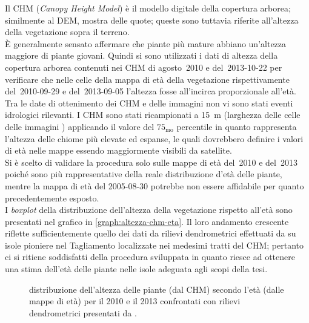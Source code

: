 Il CHM (\emph{Canopy Height Model}) è il modello digitale della copertura arborea; similmente al DEM, mostra delle quote; queste sono tuttavia riferite all'altezza della vegetazione sopra il terreno.
\\
È generalmente sensato affermare che piante più mature abbiano un'altezza maggiore di piante giovani.
Quindi si sono utilizzati i dati di altezza della copertura arborea contenuti nei CHM di agosto~2010 e del~2013-10-22 per verificare che nelle celle della mappa di età della vegetazione rispettivamente del~2010-09-29 e del~2013-09-05 l'altezza fosse all'incirca proporzionale all'età.
Tra le date di ottenimento dei CHM e delle immagini \AST{} non vi sono stati eventi idrologici rilevanti.
I CHM sono stati ricampionati a \SI{15}{\m} (larghezza delle celle delle immagini \AST{}) applicando il valore del $75_{\mathrm{mo}}$ percentile in quanto rappresenta l'altezza delle chiome più elevate ed espanse, le quali dovrebbero definire i valori di età nelle mappe essendo maggiormente visibili da satellite.
\\
Si è scelto di validare la procedura solo sulle mappe di età del~2010 e del~2013 poiché sono più rappresentative della reale distribuzione d'età delle piante, mentre la mappa di età del 2005-08-30 potrebbe non essere affidabile per quanto precedentemente esposto.
\\
I \emph{boxplot} della distribuzione dell'altezza della vegetazione rispetto all'età sono presentati nel grafico in \vref{graph:altezza-chm-eta}.
Il loro andamento crescente riflette sufficientemente quello dei dati da rilievi dendrometrici effettuati da  su isole pioniere nel Tagliamento localizzate nei medesimi tratti del CHM; pertanto ci si ritiene soddisfatti della procedura sviluppata in quanto riesce ad ottenere una stima dell'età delle piante nelle isole adeguata agli scopi della tesi.
%
\begin{figure}
	\centering
	
	\caption[distribuzione dell'altezza delle piante secondo l'età]{distribuzione dell'altezza delle piante (dal CHM) secondo l'età (dalle mappe di età) per il 2010 e il 2013 confrontati con rilievi dendrometrici presentati da .}
	\label{graph:altezza-chm-eta}
\end{figure}
%


